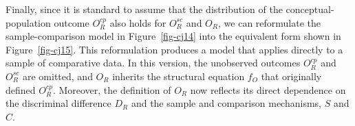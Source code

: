 \documentclass[
  authoryear,
  review,
  1p]{elsarticle}
\begin{document}
Finally, since it is standard to assume that the distribution of the
conceptual-population outcome \(O^{cp}_{R}\) also holds for
\(O^{sc}_{R}\) and \(O_{R}\), we can reformulate the sample-comparison
model in Figure~\ref{fig-cj14} into the equivalent form shown in
Figure~\ref{fig-cj15}. This reformulation produces a model that applies
directly to a sample of comparative data. In this version, the
unobserved outcomes \(O^{cp}_{R}\) and \(O^{sc}_{R}\) are omitted, and
\(O_{R}\) inherits the structural equation \(f_{O}\) that originally
defined \(O^{cp}_{R}\). Moreover, the definition of \(O_{R}\) now
reflects its direct dependence on the discriminal difference \(D_{R}\)
and the sample and comparison mechanisms, \(S\) and \(C\).

\begin{figure}[H]

\begin{minipage}{\linewidth}

\centering{

\[
\begin{aligned}
  O_{R} & := f_{O}(D_{R}, S, C) \\
  D_{R} & := f_{D}(T_{IA}, B_{JK}) \\
  T_{IA} & := f_{T}(T_{I}, X_{IA}, e_{IA}) \\
  T_{I} & := f_{T}(X_{I}, e_{I}) \\
  B_{JK} & := f_{B}(B_{J}, Z_{JK}, e_{JK}) \\
  B_{J} & := f_{B}(Z_{J}, e_{J}) \\
  e_{I} & \:\bot\:\{ e_{J}, e_{IA}, e_{JK} \} \\
  e_{J} & \:\bot\:\{ e_{IA}, e_{JK} \} \\
  e_{IA} & \:\bot\:e_{JK} 
\end{aligned}
\]

}


\end{minipage}%
\newline
\begin{minipage}{\linewidth}

\end{minipage}
\end{figure}
\end{document}
